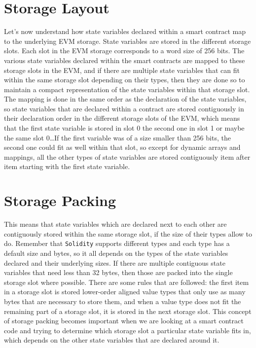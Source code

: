 \section{Storage Layout}
Let's now understand how state variables declared within a smart contract map to the underlying EVM storage. State variables are stored in the different storage slots. Each slot in the EVM storage corresponds to a word size of 256 bits. The various state variables declared within the smart contracts are mapped to these storage slots in the EVM, and if there are multiple state variables that can fit within the same storage slot depending on their types, then they are done so to maintain a compact representation of the state variables within that storage slot. The mapping is done in the same order as the declaration of the state variables, so state variables that are declared within a contract are stored contiguously in their declaration order in the different storage slots of the EVM, which means that the first state variable is stored in slot 0 the second one in slot 1 or maybe the same slot 0\dots If the first variable was of a size smaller than 256 bits, the second one could fit as well within that slot, so except for dynamic arrays and mappings, all the other types of state variables are stored contiguously item after item starting with the first state variable.

\section{Storage Packing}
This means that state variables which are declared next to each other are contiguously stored within the same storage slot, if the size of their types allow to do. Remember that \verb|Solidity| supports different types and each type has a default size and bytes, so it all depends on the types of the state variables declared and their underlying sizes. If there are multiple contiguous state variables that need less than 32 bytes, then those are packed into the single storage slot where possible. There are some rules that are followed: the first item in a storage slot is stored lower-order aligned value types that only use as many bytes that are necessary to store them, and when a value type does not fit the remaining part of a storage slot, it is stored in the next storage slot. This concept of storage packing becomes important when we are looking at a smart contract code and trying to determine which storage slot a particular state variable fits in, which depends on the other state variables that are declared around it.

